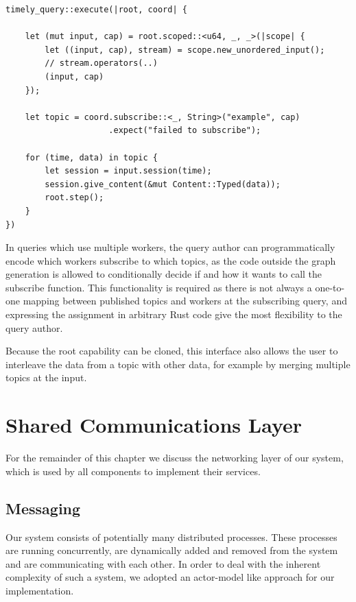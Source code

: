 \begin{lstlisting}[caption={[Typical use of the subscription handle]
Typical use of the subscription handle. This query subscribes to a single topic of
strings, with \lstinline{u64} being the type of the timestamps.
}]
timely_query::execute(|root, coord| {

    let (mut input, cap) = root.scoped::<u64, _, _>(|scope| {
        let ((input, cap), stream) = scope.new_unordered_input();
        // stream.operators(..)
        (input, cap)
    });

    let topic = coord.subscribe::<_, String>("example", cap)
                     .expect("failed to subscribe");

    for (time, data) in topic {
        let session = input.session(time);
        session.give_content(&mut Content::Typed(data));
        root.step();
    }
})
\end{lstlisting}

In queries which use multiple workers, the query author can programmatically
encode which workers subscribe to which topics, as the code outside the
graph generation is allowed to conditionally decide if and how it wants to call
the subscribe function. This functionality is required as there is not
always a one-to-one mapping between published topics and workers at the
subscribing query, and expressing the assignment in arbitrary Rust code
give the most flexibility to the query author.

Because the root capability can be cloned, this interface also allows the user to
interleave the data from a topic with other data, for example by merging
multiple topics at the input.

\section{Shared Communications Layer}

For the remainder of this chapter we discuss the networking layer of our system,
which is used by all components to implement their services.

\subsection{Messaging}

Our system consists of potentially many distributed processes. These processes
are running concurrently, are dynamically added and removed from the system
and are communicating with each other. In order to deal with the inherent
complexity of such a system, we adopted an actor-model like approach for our
implementation.


